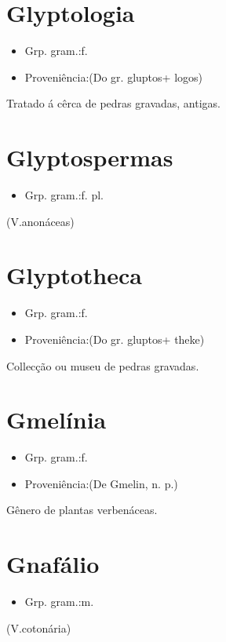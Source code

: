 \section{Glyptologia}
\begin{itemize}
\item {Grp. gram.:f.}
\end{itemize}
\begin{itemize}
\item {Proveniência:(Do gr. \textunderscore gluptos\textunderscore  + \textunderscore logos\textunderscore )}
\end{itemize}
Tratado á cêrca de pedras gravadas, antigas.
\section{Glyptospermas}
\begin{itemize}
\item {Grp. gram.:f. pl.}
\end{itemize}
(V.anonáceas)
\section{Glyptotheca}
\begin{itemize}
\item {Grp. gram.:f.}
\end{itemize}
\begin{itemize}
\item {Proveniência:(Do gr. \textunderscore gluptos\textunderscore  + \textunderscore theke\textunderscore )}
\end{itemize}
Collecção ou museu de pedras gravadas.
\section{Gmelínia}
\begin{itemize}
\item {Grp. gram.:f.}
\end{itemize}
\begin{itemize}
\item {Proveniência:(De \textunderscore Gmelin\textunderscore , n. p.)}
\end{itemize}
Gênero de plantas verbenáceas.
\section{Gnafálio}
\begin{itemize}
\item {Grp. gram.:m.}
\end{itemize}
(V.cotonária)
